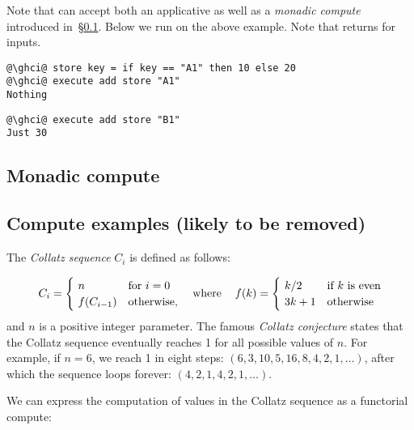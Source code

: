 \noindent
Note that  can accept both an applicative as well as a \emph{monadic
compute} introduced in~\S\ref{sec-compute-monad}. Below we run  on
the above  example. Note that  returns  for
inputs.

\vspace{1mm}
\begin{verbatim}
@\ghci@ store key = if key == "A1" then 10 else 20
@\ghci@ execute add store "A1"
Nothing
\end{verbatim}
\vspace{1mm}
\begin{verbatim}
@\ghci@ execute add store "B1"
Just 30
\end{verbatim}
\vspace{1mm}

\subsection{Monadic compute}\label{sec-compute-monad}


\subsection{Compute examples (likely to be removed)}

The \emph{Collatz sequence} $C_i$ is defined as follows:

\[
C_{i} = {\begin{cases}~n&{\text{for }}i=0\\~f(C_{i-1})&{\text{otherwise}},\end{cases}}\hspace{12pt}\text{where}\hspace{12pt}f(k)={\begin{cases}~k/2&{\text{if }}k\text{ is even}\\~3k+1&{\text{otherwise}}\end{cases}}
\vspace{2mm}
\]
\noindent
and $n$ is a positive integer parameter. The famous \emph{Collatz conjecture}
states that the Collatz sequence eventually reaches 1 for all possible values of
$n$. For example, if $n=6$, we reach 1 in eight steps:
$(6, 3, 10, 5, 16, 8, 4, 2, 1, \dots)$, after which the sequence loops forever:
$(4, 2, 1, 4, 2, 1, \dots)$.

We can express the computation of values in the Collatz sequence as a functorial
compute:

